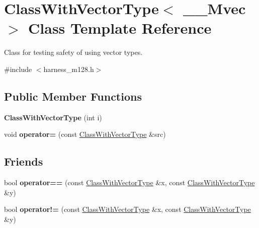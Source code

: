 \hypertarget{classClassWithVectorType}{}\section{Class\+With\+Vector\+Type$<$ \+\_\+\+\_\+\+Mvec $>$ Class Template Reference}
\label{classClassWithVectorType}


Class for testing safety of using vector types.  




{\ttfamily \#include $<$harness\+\_\+m128.\+h$>$}

\subsection*{Public Member Functions}
\begin{DoxyCompactItemize}
\item 
\hypertarget{classClassWithVectorType_a85037a08885a916a9c4bb570c4fd11f3}{}{\bfseries Class\+With\+Vector\+Type} (int i)\label{classClassWithVectorType_a85037a08885a916a9c4bb570c4fd11f3}

\item 
\hypertarget{classClassWithVectorType_a20c2f0bc80e973b5e23ff5a53a821ab7}{}void {\bfseries operator=} (const \hyperlink{classClassWithVectorType}{Class\+With\+Vector\+Type} \&src)\label{classClassWithVectorType_a20c2f0bc80e973b5e23ff5a53a821ab7}

\end{DoxyCompactItemize}
\subsection*{Friends}
\begin{DoxyCompactItemize}
\item 
\hypertarget{classClassWithVectorType_a802872aea3c080620f2e1bcf7ee13608}{}bool {\bfseries operator==} (const \hyperlink{classClassWithVectorType}{Class\+With\+Vector\+Type} \&x, const \hyperlink{classClassWithVectorType}{Class\+With\+Vector\+Type} \&y)\label{classClassWithVectorType_a802872aea3c080620f2e1bcf7ee13608}

\item 
\hypertarget{classClassWithVectorType_a257d7b08b1dba8fc07d20846aff4ded7}{}bool {\bfseries operator!=} (const \hyperlink{classClassWithVectorType}{Class\+With\+Vector\+Type} \&x, const \hyperlink{classClassWithVectorType}{Class\+With\+Vector\+Type} \&y)\label{classClassWithVectorType_a257d7b08b1dba8fc07d20846aff4ded7}

\end{DoxyCompactItemize}


